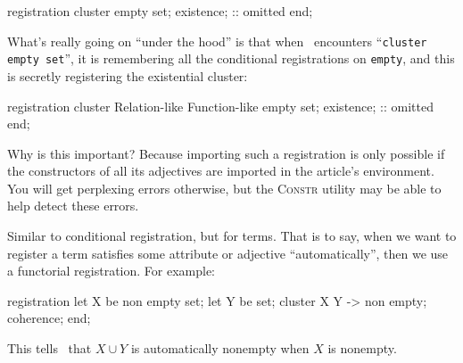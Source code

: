 \begin{node}
\begin{node}
\begin{mizar}
registration
  cluster empty set;
  existence; :: omitted
end;
\end{mizar}
What's really going on ``under the hood'' is that when \Mizar\ 
encounters ``\texttt{cluster empty set}'', it is remembering all the
conditional registrations on \texttt{empty}, and this is secretly
registering the existential cluster:
\begin{mizar}
registration
  cluster Relation-like Function-like empty set;
  existence; :: omitted
end;
\end{mizar}
Why is this important? Because importing such a registration is only
possible if the constructors of all its adjectives are imported in the
article's environment. You will get perplexing errors otherwise, but the
\textsc{Constr} utility may be able to help detect these errors.
\end{node}
\end{node}

\begin{node}[Functorial registration]\label{mizar-001Z}%
Similar to conditional registration, but for terms. That is to say, when
we want to register a term satisfies some attribute or adjective
``automatically'', then we use a functorial registration. For example:
\begin{mizar}
registration
  let X be non empty set;
  let Y be set;
  cluster X \/ Y -> non empty;
  coherence;
end;
\end{mizar}
This tells \Mizar\ that $X\cup Y$ is automatically nonempty when $X$ is
nonempty. 
\end{node}
